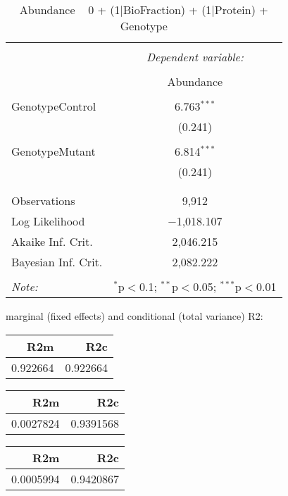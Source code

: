 \documentclass[11pt]{report}
\begin{document}
\begin{table}[!htbp] \centering 
  \caption{Abundance ~ 0 + (1|BioFraction) + (1|Protein) + Genotype} 
  \label{} 
\begin{tabular}{@{\extracolsep{5pt}}lc} 
\\[-1.8ex]\hline 
\hline \\[-1.8ex] 
 & \multicolumn{1}{c}{\textit{Dependent variable:}} \\ 
\cline{2-2} 
\\[-1.8ex] & Abundance \\ 
\hline \\[-1.8ex] 
 GenotypeControl & 6.763$^{***}$ \\ 
  & (0.241) \\ 
  & \\ 
 GenotypeMutant & 6.814$^{***}$ \\ 
  & (0.241) \\ 
  & \\ 
\hline \\[-1.8ex] 
Observations & 9,912 \\ 
Log Likelihood & $-$1,018.107 \\ 
Akaike Inf. Crit. & 2,046.215 \\ 
Bayesian Inf. Crit. & 2,082.222 \\ 
\hline 
\hline \\[-1.8ex] 
\textit{Note:}  & \multicolumn{1}{r}{$^{*}$p$<$0.1; $^{**}$p$<$0.05; $^{***}$p$<$0.01} \\ 
\end{tabular} 
\end{table} 
marginal (fixed effects) and conditional (total variance) R2:

\begin{tabular}{r|r}
\hline
R2m & R2c\\
\hline
0.922664 & 0.922664\\
\hline
\end{tabular}

\begin{tabular}{r|r}
\hline
R2m & R2c\\
\hline
0.0027824 & 0.9391568\\
\hline
\end{tabular}

\begin{tabular}{r|r}
\hline
R2m & R2c\\
\hline
0.0005994 & 0.9420867\\
\hline
\end{tabular}
\end{document}
